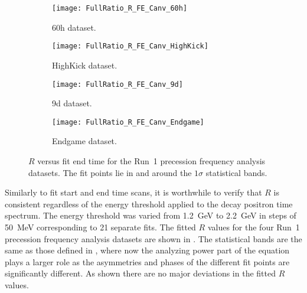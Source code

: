 \begin{figure}
\centering
    \vspace{-4mm}
    \begin{subfigure}[]{0.41\textwidth}
        \centering
        \texttt{[image: FullRatio\_R\_FE\_Canv\_60h]}
        \caption{60h dataset.}
    \end{subfigure}%
    \begin{subfigure}[]{0.41\textwidth}
        \centering
        \texttt{[image: FullRatio\_R\_FE\_Canv\_HighKick]}
        \caption{HighKick dataset.}
    \end{subfigure}

    \begin{subfigure}[]{0.41\textwidth}
        \centering
        \texttt{[image: FullRatio\_R\_FE\_Canv\_9d]}
        \caption{9d dataset.}
    \end{subfigure}%
    \begin{subfigure}[]{0.41\textwidth}
        \centering
        \texttt{[image: FullRatio\_R\_FE\_Canv\_Endgame]}
        \caption{Endgame dataset.}
    \end{subfigure}
\caption[$R$ versus fit end time]{$R$ versus fit end time for the Run~1 precession frequency analysis datasets. The fit points lie in and around the $1\sigma$ statistical bands.}
\label{fig:fitEndTime_R}
\end{figure}


Similarly to fit start and end time scans, it is worthwhile to verify that $R$ is consistent regardless of the energy threshold applied to the decay positron time spectrum. The energy threshold was varied from \SI{1.2}{\GeV} to \SI{2.2}{\GeV} in steps of \SI{50}{\MeV} corresponding to 21 separate fits. The fitted $R$ values for the four Run~1 precession frequency analysis datasets are shown in . The statistical bands are the same as those defined in , where now the analyzing power part of the equation plays a larger role as the asymmetries and phases of the different fit points are significantly different. As shown there are no major deviations in the fitted $R$ values.



